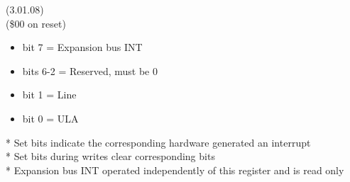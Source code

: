  (3.01.08)\\
(\$00 on reset)
\begin{itemize}
\item bit 7 = Expansion bus INT
\item bits 6-2 = Reserved, must be 0
\item bit 1 = Line
\item bit 0 = ULA
\end{itemize}
* Set bits indicate the corresponding hardware generated an interrupt\\
* Set bits during writes clear corresponding bits\\
* Expansion bus INT operated independently of this register and is read only

